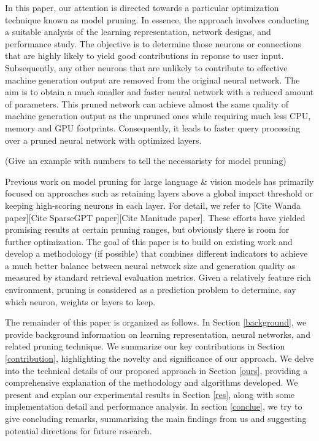 \documentclass{article} %
\begin{document}
In this paper, our attention is directed towards a particular optimization technique known as model pruning. In essence, the approach involves conducting a suitable analysis of the learning representation, network designs, and performance study. The objective is to determine those neurons or connections that are highly likely to yield good contributions in reponse to user input. Subsequently, any other neurons that are unlikely to contribute to effective machine generation output are removed from the original neural network. The aim is to obtain a much smaller and faster neural network with a reduced amount of parameters. This pruned network can achieve almost the same quality of machine generation output as the unpruned ones while requiring much less CPU, memory and GPU footprints. Consequently, it leads to faster query processing over a pruned neural network with optimized layers.

(Give an example with numbers to tell the necessaristy for model pruning)

Previous work on model pruning for large language \& vision models has primarily focused on approaches such as retaining layers above a global impact threshold or keeping high-scoring neurons in each layer. For detail, we refer to [Cite Wanda paper][Cite SparseGPT paper][Cite Manitude paper]. These efforts have yielded promising results at certain pruning ranges, but obviously there is room for further optimization. The goal of this paper is to build on existing work and develop a methodology (if possible) that combines different indicators to achieve a much better balance between neural network size and generation quality as measured by standard retrieval evaluation metrics. Given a relatively feature rich environment, pruning is considered as a prediction problem to determine, say which neuron, weights or layers to keep.

The remainder of this paper is organized as follows. In Section \ref{background}, we provide background information on learning representation, neural networks, and related pruning technique. We summarize our key contributions in Section \ref{contribution}, highlighting the novelty and significance of our approach. We delve into the technical details of our proposed approach in Section \ref{ours}, providing a comprehensive explanation of the methodology and algorithms developed. We present and explan our experimental results in Section \ref{res}, along with some implementation detail and performance analysis. In section \ref{conclue}, we try to give concluding remarks, summarizing the main findings from us and suggesting potential directions for future research.
\end{document}
